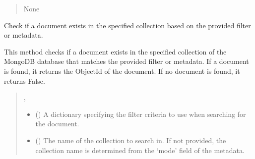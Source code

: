 \documentclass[letterpaper,10pt,english]{sphinxmanual}
\begin{document}
\begin{fulllineitems}
\begin{fulllineitems}
\begin{quote}
\begin{description}
\sphinxAtStartPar
None

\end{description}\end{quote}

\end{fulllineitems}


\begin{fulllineitems}
\label{\detokenize{forensicfit.database.database:forensicfit.database.database.Database.exists}}
\pysigstartsignatures
{}
\pysigstopsignatures
\sphinxAtStartPar
Check if a document exists in the specified collection based on the provided filter or metadata.

\sphinxAtStartPar
This method checks if a document exists in the specified collection of the MongoDB database
that matches the provided filter or metadata. If a document is found, it returns the ObjectId
of the document. If no document is found, it returns False.
\begin{quote}\begin{description}
\sphinxAtStartPar
\sphinxcode{\sphinxupquote{Union}}{[}, \sphinxcode{\sphinxupquote{bool}}{]}

\begin{itemize}
\item {} 
\sphinxAtStartPar
{} (\sphinxstyleliteralemphasis{\sphinxupquote{, }}) \textendash{} A dictionary specifying the filter criteria to use when searching for the document.

\item {} 
\sphinxAtStartPar
{} (\sphinxstyleliteralemphasis{\sphinxupquote{, }}) \textendash{} The name of the collection to search in. If not provided, the collection name is
determined from the ‘mode’ field of the metadata.


\end{itemize}
\end{description}
\end{quote}
\end{fulllineitems}
\end{fulllineitems}
\end{document}
